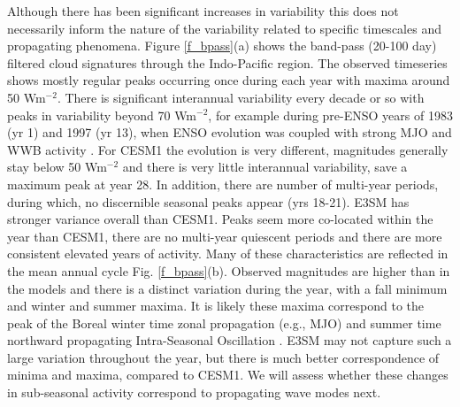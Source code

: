 \documentclass[draft,ms]{AGUTeX}
\begin{document}
\begin{article}
Although there has been significant increases in variability this does not necessarily inform the nature of the variability related to specific timescales and propagating phenomena. Figure \ref{f_bpass}(a) shows the band-pass (20-100 day) filtered cloud signatures through the Indo-Pacific region. The observed timeseries shows mostly regular peaks occurring once during each year with maxima around 50 Wm$^{-2}$. There is significant interannual variability every decade or so with peaks in variability beyond 70 Wm$^{-2}$, for example during pre-ENSO years of 1983 (yr 1) and 1997 (yr 13), when ENSO evolution was coupled with strong MJO and WWB activity \cite[e.g.,][]{Lengaigne2003}. For CESM1 the evolution is very different, magnitudes generally stay below 50 Wm$^{-2}$ and there is very little interannual variability, save a maximum peak at year 28. In addition, there are number of multi-year periods, during which, no discernible seasonal peaks appear (yrs 18-21). E3SM has stronger variance overall than CESM1. Peaks seem more co-located within the year than CESM1, there are no multi-year quiescent periods and there are more consistent elevated years of activity. Many of these characteristics are reflected in the mean annual cycle Fig. \ref{f_bpass}(b). Observed magnitudes are higher than in the models and there is a distinct variation during the year, with a fall minimum and winter and summer maxima. It is likely these maxima correspond to the peak of the Boreal winter time zonal propagation (e.g., MJO) and summer time northward propagating Intra-Seasonal Oscillation \citep[ISO, ][]{Krishnamurti1982}. E3SM may not capture such a large variation throughout the year, but there is much better correspondence of minima and maxima, compared to CESM1. We will assess whether these changes in sub-seasonal activity correspond to propagating wave modes next.


\end{article}
\end{document}
